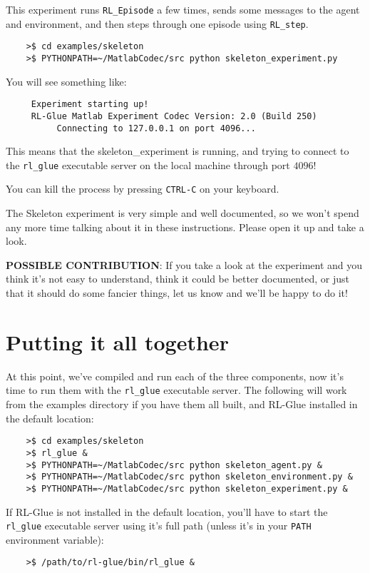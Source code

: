\documentclass[11pt]{article}
\begin{document}
This experiment runs \texttt{RL\_Episode} a few times, sends some messages to the agent and environment, and then steps through one episode using \texttt{RL\_step}.

\begin{verbatim}
	>$ cd examples/skeleton
	>$ PYTHONPATH=~/MatlabCodec/src python skeleton_experiment.py
\end{verbatim}

You will see something like:
\begin{verbatim}
     Experiment starting up!
     RL-Glue Matlab Experiment Codec Version: 2.0 (Build 250)
          Connecting to 127.0.0.1 on port 4096...
\end{verbatim}

This means that the skeleton\_experiment is running, and trying to connect to the \texttt{rl\_glue} executable server on the local machine through port $4096$!  

You can kill the process by pressing \texttt{CTRL-C} on your keyboard.


The Skeleton experiment is very simple and well documented, so we won't spend any more time talking about it in these instructions.
Please open it up and take a look.

\textbf{POSSIBLE CONTRIBUTION}: If you take a look at the experiment and you think it's not easy to understand, think it could be better documented, 
or just that it should do some fancier things, let us know and we'll be happy to do it!

\section{Putting it all together}
At this point, we've compiled and run each of the three components, now it's time to run them with the \texttt{rl\_glue} executable server.  The following will work from the examples 
directory if you have them all built, and RL-Glue installed in the default location:
\begin{verbatim}
	>$ cd examples/skeleton
	>$ rl_glue &
	>$ PYTHONPATH=~/MatlabCodec/src python skeleton_agent.py &
	>$ PYTHONPATH=~/MatlabCodec/src python skeleton_environment.py &
	>$ PYTHONPATH=~/MatlabCodec/src python skeleton_experiment.py &
\end{verbatim}

If RL-Glue is not installed in the default location, you'll have to start the \texttt{rl\_glue} executable server using it's full path (unless it's in your \texttt{PATH} environment variable):
\begin{verbatim}
	>$ /path/to/rl-glue/bin/rl_glue &
\end{verbatim}
\end{document}
